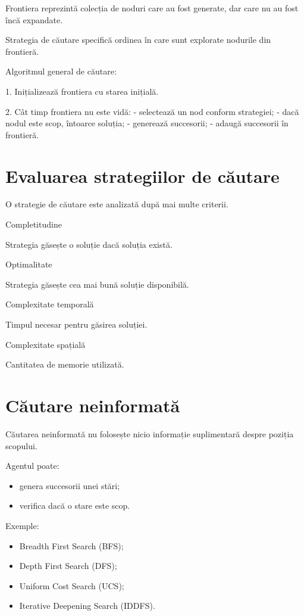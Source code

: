 \documentclass[12pt,a4paper]{article}
\begin{document}
Frontiera reprezintă colecția de noduri care au fost generate, dar care nu au fost încă expandate.

Strategia de căutare specifică ordinea în care sunt explorate nodurile din frontieră.

Algoritmul general de căutare:

1. Inițializează frontiera cu starea inițială.

2. Cât timp frontiera nu este vidă:
   - selectează un nod conform strategiei;
   - dacă nodul este scop, întoarce soluția;
   - generează succesorii;
   - adaugă succesorii în frontieră.

\section{Evaluarea strategiilor de căutare}

O strategie de căutare este analizată după mai multe criterii.

Completitudine

Strategia găsește o soluție dacă soluția există.

Optimalitate

Strategia găsește cea mai bună soluție disponibilă.

Complexitate temporală

Timpul necesar pentru găsirea soluției.

Complexitate spațială

Cantitatea de memorie utilizată.

\section{Căutare neinformată}

Căutarea neinformată nu folosește nicio informație suplimentară despre poziția scopului.

Agentul poate:

\begin{itemize}
\item genera succesorii unei stări;
\item verifica dacă o stare este scop.
\end{itemize}

Exemple:

\begin{itemize}
\item Breadth First Search (BFS);
\item Depth First Search (DFS);
\item Uniform Cost Search (UCS);
\item Iterative Deepening Search (IDDFS).
\end{itemize}
\end{document}
